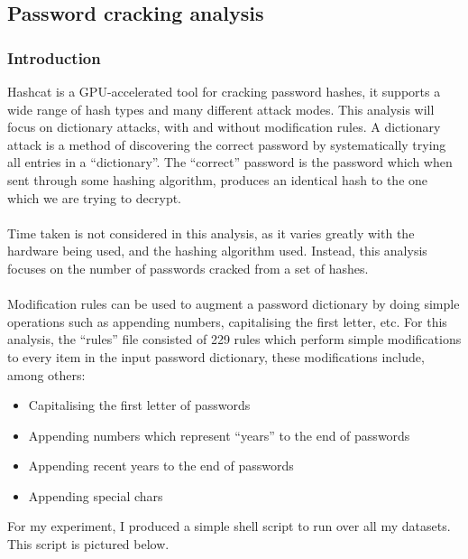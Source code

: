 \documentclass[11pt]{article}
\begin{document}
\subsection{Password cracking analysis}

\subsubsection{Introduction}
Hashcat is a GPU-accelerated tool for cracking password hashes, it supports a wide range of hash types and many different attack modes.
This analysis will focus on dictionary attacks, with and without modification rules.
A dictionary attack is a method of discovering the correct password by systematically trying all entries in a ``dictionary''.
The ``correct'' password is the password which when sent through some hashing algorithm, produces an identical hash to the one which we are trying to decrypt.\\\\
Time taken is not considered in this analysis, as it varies greatly with the hardware being used, and the hashing algorithm used.
Instead, this analysis focuses on the number of passwords cracked from a set of hashes.\\\\
Modification rules can be used to augment a password dictionary by doing simple operations such as appending numbers, capitalising the first letter, etc.
For this analysis, the ``rules'' file consisted of 229 rules which perform simple modifications to every item in the input password dictionary, these modifications include, among others:
\begin{itemize}
\item Capitalising the first letter of passwords
\item Appending numbers which represent ``years'' to the end of passwords
\item Appending recent years to the end of passwords
\item Appending special chars
\end{itemize}
For my experiment, I produced a simple shell script to run over all my datasets. This script is pictured below.
\begin{center}
\end{center}
\end{document}
